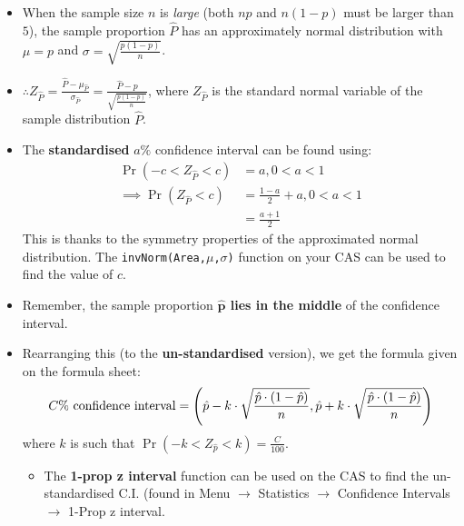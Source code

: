 \documentclass[12pt,a4paper,titlepage]{article}
\DeclarePairedDelimiter {\pars}  {  (      }     {  )      }
\begin{document}
            \begin{SummaryBox}[title=Finding confidence intervals, breakable]
                \begin{itemize}[leftmargin=*]
                    \item When the sample size $n$ is \textit{large} (both $np$ and $n(1-p)$ must be larger than $5$), the sample proportion $\hat{P}$ has an approximately normal distribution with $\mu = p$ and $\sigma = \sqrt{ \frac{p(1-p)}{n} }$.
                    \item $\therefore Z_{\hat{P}} = \frac{\hat{P} - \mu_{\hat{P}}}{\sigma_{\hat{P}}} = \frac{\hat{P} - p}{ \sqrt{ \frac{p(1-p)}{n} } }$, where $Z_{\hat{P}}$ is the standard normal variable of the sample distribution $\hat{P}$.
                    \item The \textbf{standardised} $a\%$ confidence interval can be found using:
                    \begin{align*}
                        \Pr(-c < Z_{\hat{P}} < c) &= a, 0 < a < 1 \\
                        \implies \Pr(Z_{\hat{P}} < c) &= \frac{1-a}{2} + a, 0 < a < 1 \\
                        &= \frac{a+1}{2}
                    \end{align*}
                    This is thanks to the symmetry properties of the approximated normal distribution. The \texttt{invNorm(Area,$\mu$,$\sigma$)} function on your CAS can be used to find the value of $c$.
                    \item Remember, the sample proportion \textbf{$\bm{\hat{p}}$ lies in the middle} of the confidence interval.
                    \item Rearranging this (to the \textbf{un-standardised} version), we get the formula given on the formula sheet:
                    \[
                        C\%\text{ confidence interval} = \pars*{ \hat{p} - k \cdot \sqrt{ \frac{\hat{p} \cdot (1-\hat{p})}{n} }, \hat{p} + k \cdot \sqrt{ \frac{\hat{p} \cdot (1-\hat{p})}{n} } }
                    \]
                    where $k$ is such that $\Pr(-k < Z_{\hat{p}} < k) = \frac{C}{100}$.
                    \begin{itemize}[topsep=0pt]
                        \item The \textbf{1-prop z interval} function can be used on the CAS to find the un-standardised C.I. (found in Menu $\to$ Statistics $\to$ Confidence Intervals $\to$ 1-Prop z interval.
                    \end{itemize}
                \end{itemize}
                

\end{SummaryBox}
\end{document}
